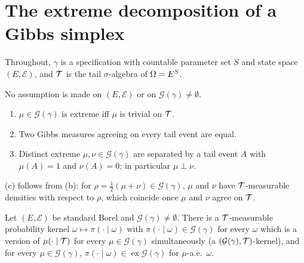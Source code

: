 \section{The extreme decomposition of a Gibbs simplex}

Throughout, $\gamma$ is a specification with countable parameter set $S$ and state space
$(E, \mathcal{E})$, and $\mathcal{T}$ is the tail $\sigma$-algebra of $\Omega = E^S$.

\begin{theorem}
    \label{thm:ext-77-concrete}
    \leanok

    No assumption is made on $(E, \mathcal{E})$ or on $\mathcal{G}(\gamma) \neq \emptyset$.
    \begin{enumerate}
        \item[(a)] $\mu \in \mathcal{G}(\gamma)$ is extreme iff $\mu$ is trivial on $\mathcal{T}$.
        \item[(c)] Two Gibbs measures agreeing on every tail event are equal.
        \item[(d)] Distinct extreme $\mu, \nu \in \mathcal{G}(\gamma)$ are separated by a tail
          event $A$ with $\mu(A) = 1$ and $\nu(A) = 0$; in particular $\mu \perp \nu$.
    \end{enumerate}
    (c) follows from (b): for $\rho = \tfrac12(\mu + \nu) \in \mathcal{G}(\gamma)$, $\mu$ and
    $\nu$ have $\mathcal{T}$-measurable densities with respect to $\rho$, which coincide once $\mu$ and
    $\nu$ agree on $\mathcal{T}$.
\end{theorem}

\begin{proposition}
    \label{prop:ext-gibbs-kernel}
    \leanok

    Let $(E, \mathcal{E})$ be standard Borel and $\mathcal{G}(\gamma) \neq \emptyset$. There is a
    $\mathcal{T}$-measurable probability kernel $\omega \mapsto \pi(\cdot \mid \omega)$ with
    $\pi(\cdot \mid \omega) \in \mathcal{G}(\gamma)$ for every $\omega$ which is a version of
    $\mu(\cdot \mid \mathcal{T})$ for every $\mu \in \mathcal{G}(\gamma)$ simultaneously (a
    $(\mathcal{G}(\gamma), \mathcal{T})$-kernel), and for every $\mu \in \mathcal{G}(\gamma)$,
    $\pi(\cdot \mid \omega) \in \operatorname{ex}\mathcal{G}(\gamma)$ for $\mu$-a.e.\ $\omega$.
\end{proposition}

